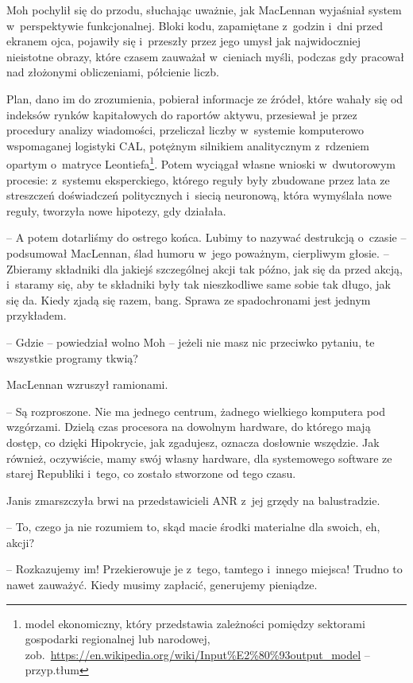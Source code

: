 \documentclass[oneside,polish,11pt,sfheadings]{mwbk}
\begin{document}
Moh pochylił się do przodu, słuchając uważnie, jak MacLennan wyjaśniał
system w~perspektywie funkcjonalnej. Bloki kodu, zapamiętane z~godzin i~dni przed ekranem ojca, pojawiły się i~przeszły przez jego umysł jak
najwidoczniej nieistotne obrazy, które czasem zauważał w~cieniach myśli,
podczas gdy pracował nad złożonymi obliczeniami, półcienie liczb.

Plan, dano im do zrozumienia, pobierał informacje ze źródeł, które
wahały się od indeksów rynków kapitałowych do raportów aktywu,
przesiewał je przez procedury analizy wiadomości, przeliczał liczby w~systemie komputerowo wspomaganej logistyki CAL, potężnym silnikiem
analitycznym z~rdzeniem opartym o~matryce
Leontiefa\footnote{ model ekonomiczny, który przedstawia zależności pomiędzy sektorami gospodarki regionalnej lub narodowej, zob.~\url{https://en.wikipedia.org/wiki/Input\%E2\%80\%93output_model} -- przyp.tłum}.
Potem wyciągał własne wnioski w~dwutorowym procesie: z~systemu
eksperckiego, którego reguły były zbudowane przez lata ze streszczeń
doświadczeń politycznych i~siecią neuronową, która wymyślała nowe
reguły, tworzyła nowe hipotezy, gdy działała.

-- A potem dotarliśmy do ostrego końca. Lubimy to nazywać destrukcją o~czasie -- podsumował MacLennan, ślad humoru w~jego poważnym, cierpliwym
głosie. -- Zbieramy składniki dla jakiejś szczególnej akcji tak późno,
jak się da przed akcją, i~staramy się, aby te składniki były tak
nieszkodliwe same sobie tak długo, jak się da. Kiedy zjadą się razem,
bang. Sprawa ze spadochronami jest jednym przykładem.

-- Gdzie -- powiedział wolno Moh -- jeżeli nie masz nic przeciwko pytaniu,
te wszystkie programy tkwią?

MacLennan wzruszył ramionami. 

-- Są rozproszone. Nie ma jednego centrum,
żadnego wielkiego komputera pod wzgórzami. Dzielą czas procesora na
dowolnym hardware, do którego mają dostęp, co dzięki Hipokrycie, jak
zgadujesz, oznacza dosłownie wszędzie. Jak również, oczywiście, mamy
swój własny hardware, dla systemowego software ze starej Republiki i~tego, co zostało stworzone od tego czasu.

Janis zmarszczyła brwi na przedstawicieli ANR z~jej grzędy na
balustradzie. 

-- To, czego ja nie rozumiem to, skąd macie środki
materialne dla swoich, eh, akcji?

-- Rozkazujemy im! Przekierowuje je z~tego, tamtego i~innego miejsca!
Trudno to nawet zauważyć. Kiedy musimy zapłacić, generujemy pieniądze.
\end{document}
